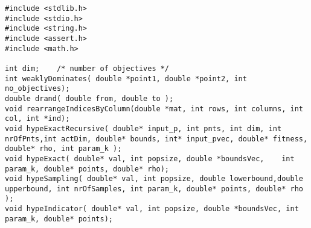 \noindent
  \begin{lstlisting}[style=C]
#include <stdlib.h>
#include <stdio.h>
#include <string.h>
#include <assert.h>
#include <math.h>

int dim;    /* number of objectives */
int weaklyDominates( double *point1, double *point2, int no_objectives);
double drand( double from, double to );
void rearrangeIndicesByColumn(double *mat, int rows, int columns, int col, int *ind);
void hypeExactRecursive( double* input_p, int pnts, int dim, int nrOfPnts,int actDim, double* bounds, int* input_pvec, double* fitness, double* rho, int param_k );
void hypeExact( double* val, int popsize, double *boundsVec,	int param_k, double* points, double* rho);
void hypeSampling( double* val, int popsize, double lowerbound,double upperbound, int nrOfSamples, int param_k, double* points, double* rho );
void hypeIndicator( double* val, int popsize, double *boundsVec, int param_k, double* points);


\end{lstlisting}

